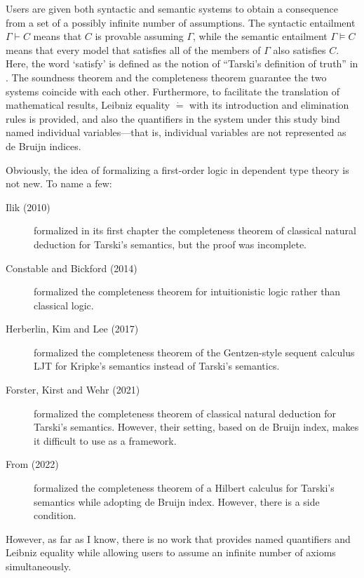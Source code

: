 \documentclass[twocolumn]{article}
\theoremstyle{definition}
\theoremstyle{definition}
\theoremstyle{definition}
\theoremstyle{definition}
\theoremstyle{definition}
\theoremstyle{definition}
\theoremstyle{definition}
\newcommand{\0}{\texttt{0}}
\newcommand{\1}{\texttt{1}}
\newcommand{\Leq}{\mathrel{\dot{=}}}
\begin{document}
Users are given both syntactic and semantic systems to obtain a consequence from a set of a possibly infinite number of assumptions.
The syntactic entailment $\Gamma \vdash C$ means that $C$ is provable assuming $\Gamma$,
while the semantic entailment $\Gamma \vDash C$ means that every model that satisfies all of the members of $\Gamma$ also satisfies $C$.
Here, the word `satisfy' is defined as the notion of ``Tarski's definition of truth'' in .
The soundness theorem and the completeness theorem guarantee the two systems coincide with each other.
Furthermore, to facilitate the translation of mathematical results, Leibniz equality $\Leq$ with its introduction and elimination rules is provided, and also
the quantifiers in the system under this study bind named individual variables---that is, individual variables are not represented as de Bruijn indices.

Obviously, the idea of formalizing a first-order logic in dependent type theory is not new. To name a few:
\begin{description}
  \item[Ilik (2010) \cite{ilik2010}]
    formalized in its first chapter the completeness theorem of classical natural deduction for Tarski's semantics,
    but the proof was incomplete.

  \item[Constable and Bickford (2014) \cite{constable2014}]
    formalized the completeness theorem for intuitionistic logic rather than classical logic.

  \item[Herberlin, Kim and Lee (2017) \cite{herberlin2017}]
    formalized the completeness theorem of the Gentzen-style sequent calculus LJT for Kripke's semantics instead of Tarski's semantics.

  \item[Forster, Kirst and Wehr (2021) \cite{forster2021}]
    formalized the completeness theorem of classical natural deduction for Tarski's semantics.
    However, their setting, based on de Bruijn index, makes it difficult to use as a framework.

  \item[From (2022) \cite{halkjaer2022}]
    formalized the completeness theorem of a Hilbert calculus for Tarski's semantics while adopting de Bruijn index.
    However, there is a side condition.
\end{description}

However, as far as I know, there is no work that provides named quantifiers and Leibniz equality
while allowing users to assume an infinite number of axioms simultaneously.
\end{document}
